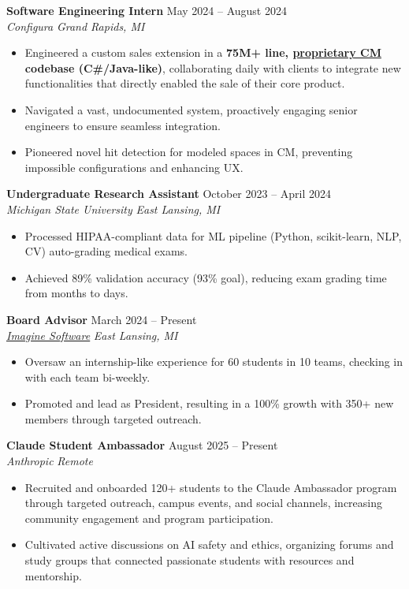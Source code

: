 \documentclass[letterpaper,11pt]{article}
\makeatletter
\newcommand{\resumeItem}[1]{
  \item\small{
    {#1 \vspace{-2pt}}
  }
}
\newcommand{\resumeSubheading}[4]{
  \vspace{-2pt}\item
  \textbf{#1} \hfill #2 \\
  \textit{\small#3} \hfill \textit{\small #4} \\
  \vspace{-7pt} %
}
\newcommand{\resumeSubSubheading}[2]{
    \item
    \begin{tabular*}{0.97\textwidth}{l@{\extracolsep{\fill}}r}
      \textit{\small#1} & \textit{\small #2} \\
    \end{tabular*}\vspace{-7pt}
}
\newcommand{\resumeSubHeadingListEnd}{\end{itemize}}
\newcommand{\resumeItemListStart}{\begin{itemize}}
\newcommand{\resumeItemListEnd}{\end{itemize}\vspace{-5pt}}
\makeatother
\begin{document}
    \resumeSubheading
      {Software Engineering Intern}{May 2024 -- August 2024}
      {Configura}{Grand Rapids, MI}
      \resumeItemListStart
        \resumeItem{Engineered a custom sales extension in a \textbf{75M+ line, \href{https://support.configura.com/hc/en-us/articles/360048763074-Configura-Magic-Introduction-and-Code-Philosophy}{proprietary CM} codebase (C\#/Java-like)}, collaborating daily with clients to integrate new functionalities that directly enabled the sale of their core product.}
        \resumeItem{Navigated a vast, undocumented system, proactively engaging senior engineers to ensure seamless integration.}
        \resumeItem{Pioneered novel hit detection for modeled spaces in CM, preventing impossible configurations and enhancing UX.}
      \resumeItemListEnd

\resumeSubheading
      {Undergraduate Research Assistant}{October 2023 -- April 2024}
      {Michigan State University}{East Lansing, MI}
      \resumeItemListStart
        \resumeItem{Processed HIPAA-compliant data for ML pipeline (Python, scikit-learn, NLP, CV) auto-grading medical exams.}
        \resumeItem{Achieved 89\% validation accuracy (93\% goal), reducing exam grading time from months to days.}
      \resumeItemListEnd

      \resumeSubheading
      {Board Advisor}{March 2024 -- Present}
      {\underline{\href{https://www.imagine-software.org/}{Imagine Software}}}{East Lansing, MI}
      \resumeItemListStart
        \resumeItem{Oversaw an internship-like experience for 60 students in 10 teams, checking in with each team bi-weekly.}
        \resumeItem{Promoted and lead as President, resulting in a 100\% growth with 350+ new members through targeted outreach.}
      \resumeItemListEnd

    \resumeSubheading
      {Claude Student Ambassador}{August 2025 -- Present}
      {Anthropic}{Remote}
    \resumeItemListStart
      \resumeItem{Recruited and onboarded 120+ students to the Claude Ambassador program through targeted outreach, campus events, and social channels, increasing community engagement and program participation.}
      \resumeItem{Cultivated active discussions on AI safety and ethics, organizing forums and study groups that connected passionate students with resources and mentorship.}
    \resumeItemListEnd

    
      
\end{document}
